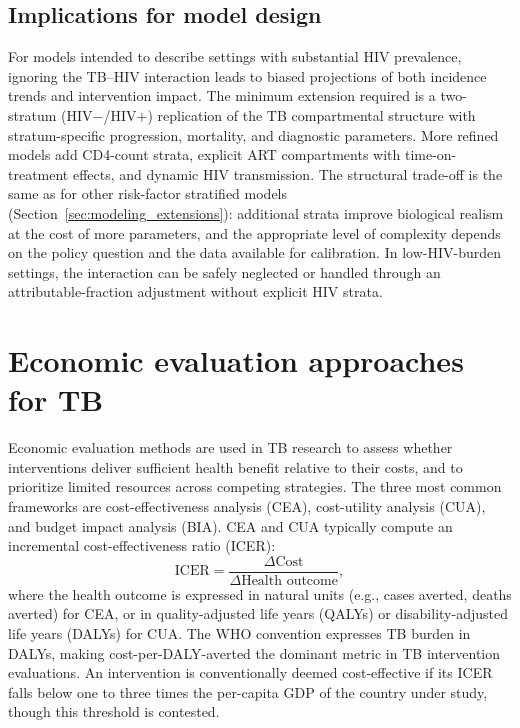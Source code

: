 \documentclass[11pt]{article}
\begin{document}
\subsection{Implications for model design}

For models intended to describe settings with substantial HIV prevalence, ignoring the TB--HIV interaction leads to biased projections of both incidence trends and intervention impact. The minimum extension required is a two-stratum (HIV$-$/HIV$+$) replication of the TB compartmental structure with stratum-specific progression, mortality, and diagnostic parameters. More refined models add CD4-count strata, explicit ART compartments with time-on-treatment effects, and dynamic HIV transmission. The structural trade-off is the same as for other risk-factor stratified models (Section~\ref{sec:modeling_extensions}): additional strata improve biological realism at the cost of more parameters, and the appropriate level of complexity depends on the policy question and the data available for calibration. In low-HIV-burden settings, the interaction can be safely neglected or handled through an attributable-fraction adjustment without explicit HIV strata.

\section{Economic evaluation approaches for TB}
\label{sec:econ}

Economic evaluation methods are used in TB research to assess whether interventions deliver sufficient health benefit relative to their costs, and to prioritize limited resources across competing strategies. The three most common frameworks are cost-effectiveness analysis (CEA), cost-utility analysis (CUA), and budget impact analysis (BIA). CEA and CUA typically compute an incremental cost-effectiveness ratio (ICER):
\[
  \text{ICER} = \frac{\Delta \text{Cost}}{\Delta \text{Health outcome}},
\]
where the health outcome is expressed in natural units (e.g., cases averted, deaths averted) for CEA, or in quality-adjusted life years (QALYs) or disability-adjusted life years (DALYs) for CUA. The WHO convention expresses TB burden in DALYs, making cost-per-DALY-averted the dominant metric in TB intervention evaluations. An intervention is conventionally deemed cost-effective if its ICER falls below one to three times the per-capita GDP of the country under study, though this threshold is contested.
\end{document}
